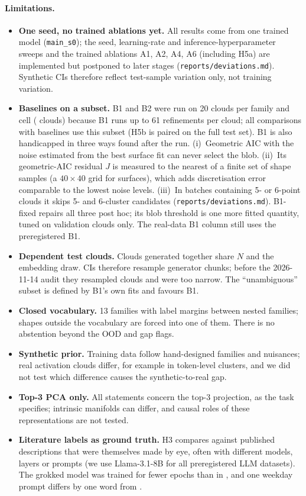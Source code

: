 \paragraph{Limitations.}
\label{sec:limitations}
\begin{itemize}
\item \textbf{One seed, no trained ablations yet.} All results come from one trained model (\texttt{main\_s0}); the seed, learning-rate and inference-hyperparameter sweeps and the trained ablations A1, A2, A4, A6 (including H5a) are implemented but postponed to later stages (\texttt{reports/deviations.md}). Synthetic CIs therefore reflect test-sample variation only, not training variation.
\item \textbf{Baselines on a subset.} B1 and B2 were run on 20 clouds per family and cell (\nBone{} clouds) because B1 runs up to 61 refinements per cloud; all comparisons with baselines use this subset (H5b is paired on the full test set). B1 is also handicapped in three ways found after the run. (i)~Geometric AIC with the noise estimated from the best surface fit can never select the blob. (ii)~Its geometric-AIC residual $J$ is measured to the nearest of a finite set of shape samples (a $40\times40$ grid for surfaces), which adds discretisation error comparable to the lowest noise levels. (iii)~In batches containing 5- or 6-point clouds it skips 5- and 6-cluster candidates (\texttt{reports/deviations.md}). B1-fixed repairs all three post hoc; its blob threshold is one more fitted quantity, tuned on validation clouds only. The real-data B1 column still uses the preregistered B1.
\item \textbf{Dependent test clouds.} Clouds generated together share $N$ and the embedding draw. CIs therefore resample generator chunks; before the 2026-11-14 audit they resampled clouds and were too narrow. The ``unambiguous'' subset is defined by B1's own fits and favours B1.
\item \textbf{Closed vocabulary.} 13 families with label margins between nested families; shapes outside the vocabulary are forced into one of them. There is no abstention beyond the OOD and gap flags.
\item \textbf{Synthetic prior.} Training data follow hand-designed families and nuisances; real activation clouds differ, for example in token-level clusters, and we did not test which difference causes the synthetic-to-real gap.
\item \textbf{Top-3 PCA only.} All statements concern the top-3 projection, as the task specifies; intrinsic manifolds can differ, and causal roles of these representations are not tested.
\item \textbf{Literature labels as ground truth.} H3 compares against published descriptions that were themselves made by eye, often with different models, layers or prompts (we use Llama-3.1-8B for all preregistered LLM datasets). The grokked model was trained for fewer epochs than in \citet{nanda2023progress}, and one weekday prompt differs by one word from \citet{engels2025notall}.
\end{itemize}
